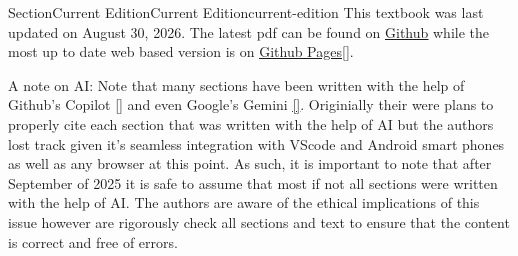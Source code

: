 \documentclass[oneside,10pt,]{book}
\newcommand{\xreffont}{\relax}
\newcommand{\linkhilite}[1]{\underline{#1}}
\numberwithin{equation}{section}
\begin{document}
\null\clearpage
%
%
\typeout{************************************************}
\typeout{************************************************}
%
\begin{sectionptx}{Section}{Current Edition}{}{Current Edition}{}{}{current-edition}
This textbook was last updated on August 30, 2026. The latest pdf can be found on \href{https://github.com/cmontalvo251/project-based-instrumentation/blob/main/main.pdf}{\linkhilite{Github}} while the most up to date web based version is on \href{https://cmontalvo251.github.io/project-based-instrumentation/}{\linkhilite{Github Pages}}\hyperlink{Github}{\linkhilite{[{\xreffont 33}]}}.%
\par
A note on AI: Note that many sections have been written with the help of Github’s Copilot \hyperlink{copilot}{\linkhilite{[{\xreffont 1}]}} and even Google’s Gemini \hyperlink{gemini}{\linkhilite{[{\xreffont 2}]}}. Originially their were plans to properly cite each section that was written with the help of AI but the authors lost track given it’s seamless integration with VScode and Android smart phones as well as any browser at this point. As such, it is important to note that after September of 2025 it is safe to assume that most if not all sections were written with the help of AI. The authors are aware of the ethical implications of this issue however are rigorously check all sections and text to ensure that the content is correct and free of errors.%
\end{sectionptx}
%
%
\typeout{************************************************}
\typeout{************************************************}
%
\end{document}
